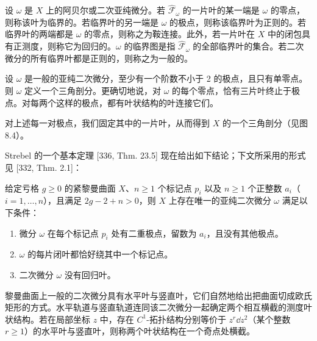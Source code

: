 \begin{definition}[8.8] 设 $\omega$ 是 $X$ 上的阿贝尔或二次亚纯微分。若 $\hat{\mathcal{F}}_\omega$ 的一片叶的某一端是 $\omega$ 的零点，则称该叶为临界的。若临界叶的另一端是 $\omega$ 的极点，则称该临界叶为正则的。若临界叶的两端都是 $\omega$ 的零点，则称之为鞍连接。此外，若一片叶在 $X$ 中的闭包具有正测度，则称它为回归的。$\omega$ 的临界图是指 $\hat{\mathcal{F}}_\omega$ 的全部临界叶的集合。若二次微分的所有临界叶都是正则的，则称之为一般的。\end{definition}


设 $\omega$ 是一般的亚纯二次微分，至少有一个阶数不小于 2 的极点，且只有单零点。则 $\omega$ 定义一个三角剖分。更确切地说，对 $\omega$ 的每个零点，恰有三片叶终止于极点。对每两个这样的极点，都有叶状结构的叶连接它们。

对上述每一对极点，我们固定其中的一片叶，从而得到 $X$ 的一个三角剖分（见图 8.4）。


Strebel 的一个基本定理 [336, Thm. 23.5] 现在给出如下结论；下文所采用的形式见 [332, Thm. 2.1]：

\begin{theorem}[8.9] 给定亏格 $g\ge 0$ 的紧黎曼曲面 $X$、$n\ge 1$ 个标记点 $p_i$ 以及 $n\ge 1$ 个正整数 $a_i$（$i=1,\dots,n$），且满足 $2g-2+n>0$，则 $X$ 上存在唯一的亚纯二次微分 $\omega$ 满足以下条件：
\begin{enumerate}[label=\arabic*.]
\item 微分 $\omega$ 在每个标记点 $p_i$ 处有二重极点，留数为 $a_i$，且没有其他极点。
\item $\omega$ 的每片闭叶都恰好绕其中一个标记点。
\item 二次微分 $\omega$ 没有回归叶。
\end{enumerate}
\end{theorem}

黎曼曲面上一般的二次微分具有水平叶与竖直叶，它们自然地给出把曲面切成欧氏矩形的方式。水平轨道与竖直轨道连同该二次微分一起确定两个相互横截的测度叶状结构。若在局部坐标 $z$ 中，存在 $C^1$-拓扑结构分别等价于 $z^r\dd z^2$（某个整数 $r\ge 1$）的水平叶与竖直叶，则称两个叶状结构在一个奇点处横截。

